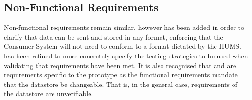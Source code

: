 \subsection{Non-Functional Requirements}
Non-functional requirements remain similar, however  has been 
added in order to clarify that data can be sent and stored in any format, 
enforcing that the Consumer System will not need to conform to a format
dictated by the HUMS.  has been refined to more concretely specify the testing strategies to be used when validating that requirements have been met.
It is also recognised that  and  are requirements 
specific to the prototype as the functional requirements mandate that the 
datastore be changeable. That is, in the general case, requirements 
of the datastore are unverifiable.

